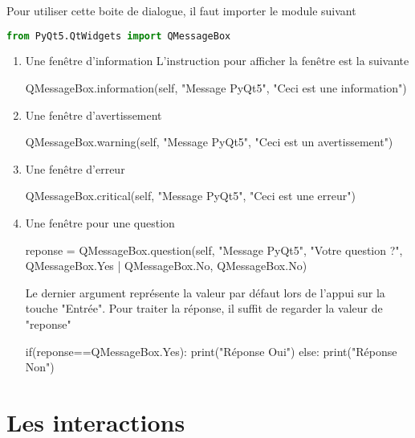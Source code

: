 {Pour utiliser cette boite de dialogue, il faut importer le module suivant
\begin{lstlisting}[language=Python]
from PyQt5.QtWidgets import QMessageBox
\end{lstlisting}


\begin{enumerate}
    \item Une fenêtre d'information
    L'instruction pour afficher la fenêtre est la suivante
    \begin{Python}
    QMessageBox.information(self, "Message PyQt5", "Ceci est une information")
    \end{Python}
    \item Une fenêtre d'avertissement
    \begin{Python}
    QMessageBox.warning(self, "Message PyQt5", "Ceci est un avertissement")
    \end{Python}
    \item Une fenêtre d'erreur
    \begin{Python}
    QMessageBox.critical(self, "Message PyQt5", "Ceci est une erreur")
    \end{Python}
    \item Une fenêtre pour une question 
    \begin{Python}
    reponse = QMessageBox.question(self, "Message PyQt5", "Votre question ?", QMessageBox.Yes | QMessageBox.No, QMessageBox.No)
    \end{Python}
    Le dernier argument représente la valeur par défaut lors de l'appui sur la touche "Entrée". \newline
    Pour traiter la réponse, il suffit de regarder la valeur de "reponse"
    \begin{Python}
    if(reponse==QMessageBox.Yes):
        print("Réponse Oui")
    else:
        print("Réponse Non")
    \end{Python}
\end{enumerate}





\chapter{Les interactions}

}
